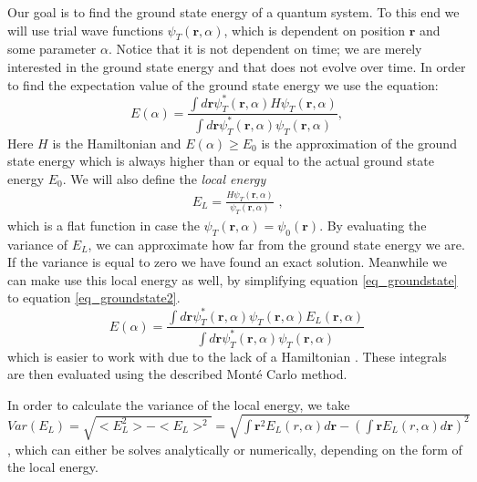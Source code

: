 Our goal is to find the ground state energy of a quantum system. To this end we will
use trial wave functions $\psi_T(\textbf{r},\alpha)$, which is dependent on position $\textbf{r}$ and some parameter $\alpha$.
Notice that it is not dependent on time; we are merely interested in the ground state energy and that does not evolve over time.
In order to find the expectation value of the ground state energy we use the equation:
\begin{equation}
	\label{eq_groundstate}
	E(\alpha) = \frac{\int d\textbf{r} \psi_T^*(\textbf{r},\alpha)H\psi_T(\textbf{r},\alpha)}{\int d\textbf{r}
	 \psi_T^*(\textbf{r},\alpha)\psi_T(\textbf{r},\alpha)},
\end{equation}
Here $H$ is the Hamiltonian and $E(\alpha) \geq E_0$ is the approximation of the ground state energy which is always higher
than or equal to the actual ground state energy $E_0$.  We will also define the
\textit{local energy}
\begin{align}
	\label{eq:local_energy}
	E_L = \frac{H\psi_T(\textbf{r},\alpha)}{\psi_T(\textbf{r},\alpha)} \text{~,}
\end{align}
 which is a flat function in case
the $\psi_T(\textbf{r},\alpha) = \psi_0(\textbf{r})$. By evaluating the variance of $E_L$, we can approximate how far from
the ground state energy we are. If the variance is equal to zero we have found an exact solution. Meanwhile we can make use
this local energy as well, by simplifying equation \ref{eq_groundstate} to equation \ref{eq_groundstate2}.
\begin{equation}
	\label{eq_groundstate2}
	E(\alpha) = \frac{\int d\textbf{r} \psi_T^*(\textbf{r},\alpha)\psi_T(\textbf{r},\alpha)E_L(\textbf{r},\alpha)}{\int d\textbf{r} \psi_T^*(\textbf{r},\alpha)\psi_T(\textbf{r},\alpha)}
\end{equation}
which is easier to work with due to the lack of a Hamiltonian \cite{JosBook}. These integrals are then evaluated using
the described Mont\'e Carlo method.


In order to calculate the variance of the local energy, we take
$Var(E_L) = \sqrt{<E_L^2> - <E_L>^2} = \sqrt{ \int \textbf{r}^2 E_L(\textit{r},\alpha) d\textbf{r} -
(\int \textbf{r} E_L(\textit{r},\alpha)d\textbf{r})^2 } $, %
which can either be solves analytically or numerically, depending on the form of the local energy.

